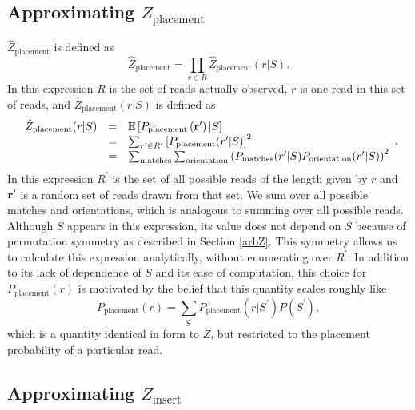 \documentclass[phd,tocprelim]{cornell}
\begin{document}
\subsection{Approximating $Z_{\text{placement}}$} %
\label{sub:Aprroximating Z_placement}

$\hat{Z}_{\text{placement}}$ is defined as
\begin{equation}
    \hat{Z}_{\text{placement}} = \prod_{r \in R} \hat{Z}_{\text{placement}}(r|S).
\end{equation}
In this expression $R$ is the set of reads actually observed, $r$ is one read in this set of reads, and $\hat{Z}_{\text{placement}}(r|S)$ is defined as
\begin{equation}
    \begin{array}{lcl}
        \hat{Z}_{\text{placement}}(r|S) & = & \mathbb{E}\left[P_{\text{placement}}\left({\bf r^{\prime}}\right)|S\right] \\
        & = & \sum_{r^{\prime} \in R^{\prime}} \left[ P_{\text{placement}}(r^{\prime}|S)\right]^{2} \\
        & = & \sum_{\text{matches}} \sum_{\text{orientation}} \left(P_{\text{matches}}(r^{\prime}|S)P_{\text{orientation}}(r^{\prime}|S)\right)^{2}
    \end{array}.
\end{equation}
In this expression $R^{\prime}$ is the set of all possible reads of the length given by $r$ and ${\bf r^{\prime}}$ is a random set of reads drawn from that set. We sum over all possible matches and orientations, which is analogous to summing over all possible reads. Although $S$ appears in this expression, its value does not depend on $S$ because of permutation symmetry as described in Section \ref{arbZ}. This symmetry allows us to calculate this expression analytically, without enumerating over $R^{\prime}$.  In addition to its lack of dependence of $S$ and its ease of computation, this choice for $P_{\text{placement}}(r)$ is motivated by the belief that this quantity scales roughly like
\begin{equation}
    P_{\text{placement}}(r) = \sum_{S^{\prime}}P_{\text{placement}}(r|S^{\prime})P(S^{\prime}),
\end{equation}
which is a quantity identical in form to $Z$, but restricted to the placement probability of a particular read.


\subsection{Approximating $Z_{\text{insert}}$} %
\label{sub:Aprroximating Z_insert}
\end{document}
